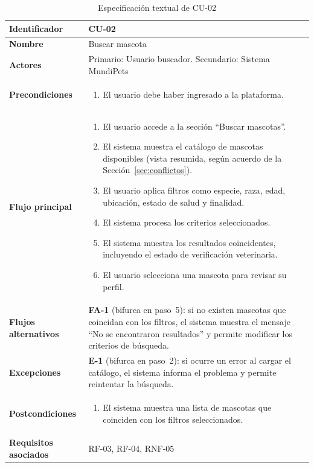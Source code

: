 \documentclass[journal,onecolumn]{IEEEtran}
\begin{document}
\begin{table}[H]
\caption{Especificación textual de CU-02}
\label{tab:cu02}
\begin{tabularx}{\textwidth}{|l|X|}
\hline
\textbf{Identificador}       & CU-02 \\
\hline
\textbf{Nombre}              & Buscar mascota \\
\hline
\textbf{Actores}             & Primario: Usuario buscador. Secundario: Sistema MundiPets \\
\hline
\textbf{Precondiciones}      & \begin{enumerate}[leftmargin=*,topsep=0pt]
                                 \item El usuario debe haber ingresado a la plataforma.
                               \end{enumerate} \\
\hline
\textbf{Flujo principal}     & \begin{enumerate}[leftmargin=*,topsep=0pt]
                                 \item El usuario accede a la sección ``Buscar mascotas''.
                                 \item El sistema muestra el catálogo de mascotas disponibles (vista resumida, según acuerdo de la Sección~\ref{sec:conflictos}).
                                 \item El usuario aplica filtros como especie, raza, edad, ubicación, estado de salud y finalidad.
                                 \item El sistema procesa los criterios seleccionados.
                                 \item El sistema muestra los resultados coincidentes, incluyendo el estado de verificación veterinaria.
                                 \item El usuario selecciona una mascota para revisar su perfil.
                               \end{enumerate} \\
\hline
\textbf{Flujos alternativos} & \textbf{FA-1} (bifurca en paso~5): si no existen mascotas que coincidan con los filtros, el sistema muestra el mensaje ``No se encontraron resultados'' y permite modificar los criterios de búsqueda. \\
\hline
\textbf{Excepciones}         & \textbf{E-1} (bifurca en paso~2): si ocurre un error al cargar el catálogo, el sistema informa el problema y permite reintentar la búsqueda. \\
\hline
\textbf{Postcondiciones}     & \begin{enumerate}[leftmargin=*,topsep=0pt]
                                 \item El sistema muestra una lista de mascotas que coinciden con los filtros seleccionados.
                               \end{enumerate} \\
\hline
\textbf{Requisitos asociados} & RF-03, RF-04, RNF-05 \\
\hline
\end{tabularx}
\end{table}
\end{document}
